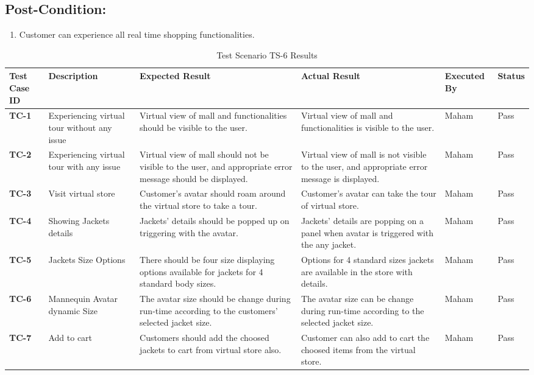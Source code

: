 \subsection{Post-Condition:}
\begin{enumerate}
  \item Customer can experience all real time shopping functionalities.
\end{enumerate}

\begin{table}[H]
    \centering
   \begin{tabular}{ | m{1cm} | m{2.3cm}| m{3cm} | m{3cm} | m{1.7cm} | m{1.3cm} |}  
  \hline  \textbf{Test Case ID} &  \textbf{Description} &  \textbf{Expected Result} &  \textbf{Actual Result} &  \textbf{Executed By} &  \textbf{Status}  \\  \hline
  \textbf{TC-1} & Experiencing virtual tour without any issue & Virtual view of mall and functionalities should be visible to the user. & Virtual view of mall and functionalities is visible to the user. & Maham & Pass
  \\  \hline
  \textbf{TC-2} & Experiencing virtual tour with any issue & Virtual view of mall should not be visible to the user, and appropriate error message should be displayed. & Virtual view of mall is not visible to the user, and appropriate error message is displayed. & Maham & Pass
  \\  \hline
  \textbf{TC-3} & Visit virtual store & Customer’s avatar should roam around the virtual store to take a tour. & Customer’s avatar can take the tour of virtual store. & Maham & Pass
  \\  \hline
  \textbf{TC-4} & Showing Jackets details & Jackets’ details should be popped up on triggering with the avatar. & Jackets’ details are popping on a panel when avatar is triggered with the any jacket. & Maham & Pass
  \\  \hline
  \textbf{TC-5} & Jackets Size Options & There should be four size displaying options available for jackets for 4 standard body sizes. & Options for 4 standard sizes jackets are available in the store with details. & Maham & Pass
  \\  \hline
  \textbf{TC-6} & Mannequin Avatar dynamic Size  & The avatar size should be change during run-time according to the customers’ selected jacket size. & The avatar size can be change during run-time according to the selected jacket size. & Maham & Pass
  \\  \hline
  \textbf{TC-7} & Add to cart  & Customers should add the choosed jackets to cart from virtual store also. & Customer can also add to cart the choosed items from the virtual store. & Maham & Pass
  \\  \hline
  
\end{tabular}
    \caption{Test Scenario TS-6 Results}
    \label{tab: Test Scenario TS-6 Results}
\end{table}

